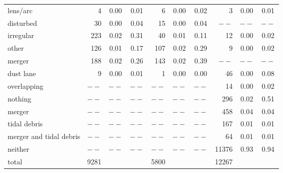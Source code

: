 \documentclass[iop,apj,tighten]{emulateapj}
\begin{document}
\begin{table*}
\begin{tabular}{l|rcc|rcc|rcc}
    lens/arc                &      4 & 0.00 & 0.01 &      6 & 0.00 & 0.02       &      3 & 0.00 & 0.01                                                   \\
    disturbed               &     30 & 0.00 & 0.04 &     15 & 0.00 & 0.04       &   $--$ & $--$ & $--$                                                   \\
    irregular               &    223 & 0.02 & 0.31 &     40 & 0.01 & 0.11       &     12 & 0.00 & 0.02                                                   \\
    other                   &    126 & 0.01 & 0.17 &    107 & 0.02 & 0.29       &      9 & 0.00 & 0.02                                                   \\
    merger                  &    188 & 0.02 & 0.26 &    143 & 0.02 & 0.39       &   $--$ & $--$ & $--$                                                   \\
    dust lane               &      9 & 0.00 & 0.01 &      1 & 0.00 & 0.00       &     46 & 0.00 & 0.08                                                   \\
    overlapping             &  $--$  & $--$ & $--$ &   $--$ & $--$ & $--$       &     14 & 0.00 & 0.02                                                   \\
    nothing                 &  $--$  & $--$ & $--$ &   $--$ & $--$ & $--$       &    296 & 0.02 & 0.51                                                   \\
    \hline                                                                                     
    merger                  & $--$ & $--$ & $--$ & $--$ & $--$ & $--$           &    458 & 0.04 & 0.04                               \\
    tidal debris            & $--$ & $--$ & $--$ & $--$ & $--$ & $--$           &    167 & 0.01 & 0.01                               \\
    merger and tidal debris & $--$ & $--$ & $--$ & $--$ & $--$ & $--$           &     64 & 0.01 & 0.01                               \\
    neither                 & $--$ & $--$ & $--$ & $--$ & $--$ & $--$           &  11376 & 0.93 & 0.94                               \\
    \hline
    total                   & 9281 &      &      & 5800     &      &                &  12267 &      &                                    \\
    \hline\hline
\end{tabular}
\end{table*}
                                           
\end{document}
